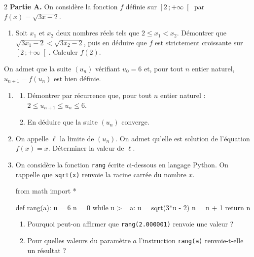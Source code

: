 \documentclass[a4paper,10pt]{article}
\makeatletter
\newcommand{\lycee@intfo}[2]{\left[#1\,;#2\right[}
\providecommand{\intfo}{\lycee@intfo}%
\makeatother
\begin{document}
\begin{multicols}{2}
\smallskip
\textbf{Partie A.} On considère la fonction $f$ définie sur $\intfo{2}{+\infty}$ par
$f(x)=\sqrt{3x-2}$.
\begin{enumerate}
  \item Soit $x_{1}$ et $x_{2}$ deux nombres réels tels que $2\leq x_{1}<x_{2}$.
        Démontrer que $\sqrt{3x_{1}-2}<\sqrt{3x_{2}-2}$, puis en déduire que $f$ est
        strictement croissante sur $\intfo{2}{+\infty}$. Calculer $f(2)$.
\end{enumerate}
On admet que la suite $(u_{n})$ vérifiant $u_{0}=6$ et, pour tout $n$ entier naturel,
$u_{n+1}=f(u_{n})$ est bien définie.
\begin{enumerate}[resume]
  \item
  \begin{enumerate}[label=\alph*)]
    \item Démontrer par récurrence que, pour tout $n$ entier naturel :
          $2\leq u_{n+1}\leq u_{n}\leq 6$.
    \item En déduire que la suite $(u_{n})$ converge.
  \end{enumerate}
  \item On appelle $\ell$ la limite de $(u_{n})$. On admet qu'elle est solution de
        l'équation $f(x)=x$. Déterminer la valeur de $\ell$.
  \item On considère la fonction \texttt{rang} écrite ci-dessous en langage Python. On
        rappelle que \texttt{sqrt(x)} renvoie la racine carrée du nombre $x$.
\begin{python}
from math import *

def rang(a):
    u = 6
    n = 0
    while u >= a:
        u = sqrt(3*u - 2)
        n = n + 1
    return n
\end{python}
  \begin{enumerate}[label=\alph*)]
    \item Pourquoi peut-on affirmer que \texttt{rang(2.000001)} renvoie une valeur ?
    \item Pour quelles valeurs du paramètre $a$ l'instruction \texttt{rang(a)}
          renvoie-t-elle un résultat ?
  \end{enumerate}
\end{enumerate}


\end{multicols}
\end{document}
